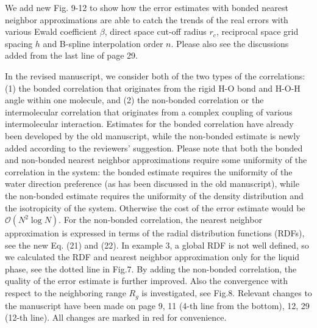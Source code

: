 \documentclass[a4paper]{article}
\begin{document}
We add new Fig. 9-12 to show how the error estimates
with bonded nearest neighbor approximations are able to catch the
trends of the real errors with various Ewald coefficient $\beta$, direct space
cut-off radius $r_c$, reciprocal space grid spacing $h$ and B-spline
interpolation order $n$.
Please also see the discussions added
from the last line of page 29.

In the revised manuscript,
we consider both of the two types of the correlations:
(1) the bonded correlation
that originates from the rigid H-O
bond and H-O-H angle within one molecule,
and (2) the
non-bonded correlation or the
intermolecular correlation that originates from
a complex coupling of various intermolecular interaction.
Estimates for the bonded correlation
have already been developed by the old manuscript,
while the non-bonded estimate
is newly added according to the reviewers' suggestion.
Please note that
both the bonded and non-bonded nearest neighbor approximations
require some uniformity of the correlation in the system:
the bonded estimate requires the uniformity of the water
direction preference (as has been discussed in the old manuscript),
while the non-bonded estimate requires the uniformity
of the density distribution and the isotropicity of the system.
Otherwise the cost of the error estimate would be $\mathcal O(N^2\log N)$.
For the non-bonded correlation,  the nearest neighbor approximation 
is expressed in terms of the radial distribution
functions (RDFs), see the new Eq. (21) and (22). In example 3, a global RDF is not well defined,
so we calculated the RDF and nearest neighbor approximation
only for the liquid phase, see the dotted line in Fig.7. By adding
the non-bonded correlation, the quality of the error estimate
is further improved.
Also the convergence with respect to
the neighboring range $R_g$ is investigated, see Fig.8.
Relevant changes to the manuscript
have been made on page 9,
11 (4-th line from the bottom), 12, 29 (12-th line). All changes are marked 
in red for convenience.
\\
\end{document}
